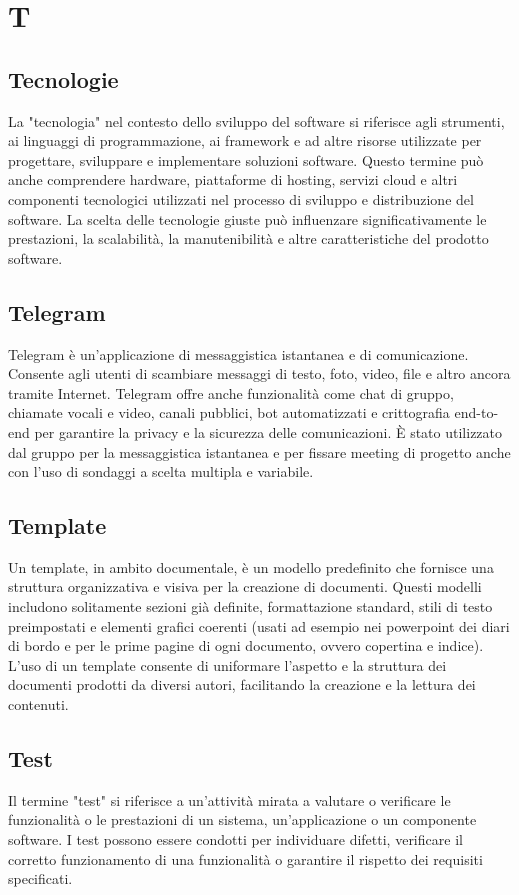 \section{T} 
\subsection{Tecnologie} 
La "tecnologia" nel contesto dello sviluppo del software si riferisce agli strumenti, ai linguaggi di programmazione, ai framework e ad altre risorse utilizzate per progettare, sviluppare e implementare soluzioni software. Questo termine può anche comprendere hardware, piattaforme di hosting, servizi cloud e altri componenti tecnologici utilizzati nel processo di sviluppo e distribuzione del software. La scelta delle tecnologie giuste può influenzare significativamente le prestazioni, la scalabilità, la manutenibilità e altre caratteristiche del prodotto software. 
\subsection{Telegram} 
Telegram è un'applicazione di messaggistica istantanea e di comunicazione. Consente agli utenti di scambiare messaggi di testo, foto, video, file e altro ancora tramite Internet. Telegram offre anche funzionalità come chat di gruppo, chiamate vocali e video, canali pubblici, bot automatizzati e crittografia end-to-end per garantire la privacy e la sicurezza delle comunicazioni. È stato utilizzato dal gruppo per la messaggistica istantanea e per fissare meeting di progetto anche con l’uso di sondaggi a scelta multipla e variabile.
\subsection{Template} 
Un template, in ambito documentale, è un modello predefinito che fornisce una struttura organizzativa e visiva per la creazione di documenti. Questi modelli includono solitamente sezioni già definite, formattazione standard, stili di testo preimpostati e elementi grafici coerenti (usati ad esempio nei powerpoint dei diari di bordo e per le prime pagine di ogni documento, ovvero copertina e indice). L'uso di un template consente di uniformare l'aspetto e la struttura dei documenti prodotti da diversi autori, facilitando la creazione e la lettura dei contenuti. 
\subsection{Test} 
Il termine "test" si riferisce a un'attività mirata a valutare o verificare le funzionalità o le prestazioni di un sistema, un'applicazione o un componente software. I test possono essere condotti per individuare difetti, verificare il corretto funzionamento di una funzionalità o garantire il rispetto dei requisiti specificati. 
